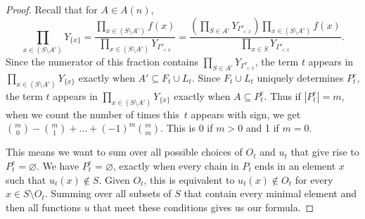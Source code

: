 \documentclass[pdftex]{sigma}
\numberwithin{equation}{section}
\begin{document}
\begin{proof}
Recall that for $A\in A(n)$,
\[ \prod_{x\in (S\setminus A')}Y_{\{x\}}=\frac{\prod_{x\in (S\setminus A')}f(x)}{\prod_{x\in (S\setminus A')}Y_{\Gamma_{< x}^v}}=\frac{\left(\prod_{S\in A'} Y_{\Gamma_{< x}^v}\right)\prod_{x\in (S\setminus A')}f(x)}{\prod_{x\in S}Y_{\Gamma_{< x}^v}}.\]
Since the numerator of this fraction contains $\prod_{S\in A'} Y_{\Gamma_{< x}^v}$, the term $t$ appears in $\prod_{x\in (S\setminus A')}Y_{\{x\}}$ exactly when $A'\subseteq F_t\cup L_t$. Since $F_t\cup L_t$ uniquely determines $P_t^e$, the term $t$ appears in $\prod_{x\in (S\setminus A')}Y_{\{x\}}$ exactly when $A\subseteq P_t^e$. Thus if $|P_t^e|=m$, when we count the number of times this~$t$ appears with sign, we get ${m \choose 0}-{m \choose 1}+\dots+(-1)^{m}{m \choose m}$. This is 0 if $m>0$ and 1 if $m=0$.

This means we want to sum over all possible choices of $O_t$ and $u_t$ that give rise to $P_t^e=\varnothing$. We have $P_t^e=\varnothing$, exactly when every chain in $P_t$ ends in an element $x$ such that $u_t(x)\not\in S$. Given $O_t$, this is equivalent to $u_t(x)\not\in O_t$ for every $x\in S\setminus O_t$. Summing over all subsets of $S$ that contain every minimal element and then all functions $u$ that meet these conditions gives us our formula.
\end{proof}
\end{document}
